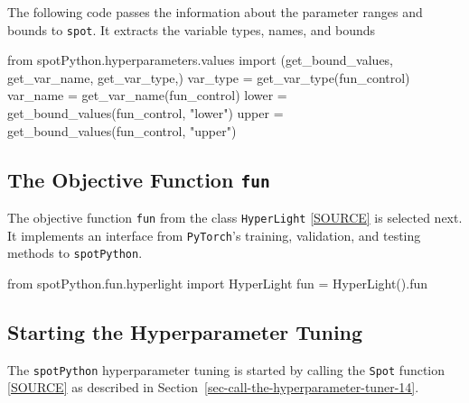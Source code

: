 \documentclass[
  letterpaper,
  DIV=11,
  numbers=noendperiod]{scrreprt}
\newenvironment{Shaded}{\begin{snugshade}}{\end{snugshade}}
\newcommand{\ImportTok}[1]{\textcolor[rgb]{0.00,0.46,0.62}{#1}}
\newcommand{\NormalTok}[1]{\textcolor[rgb]{0.00,0.23,0.31}{#1}}
\newcommand{\OperatorTok}[1]{\textcolor[rgb]{0.37,0.37,0.37}{#1}}
\newcommand{\StringTok}[1]{\textcolor[rgb]{0.13,0.47,0.30}{#1}}
\begin{document}
The following code passes the information about the parameter ranges and
bounds to \texttt{spot}. It extracts the variable types, names, and
bounds

\begin{Shaded}
\begin{Highlighting}[]
\ImportTok{from}\NormalTok{ spotPython.hyperparameters.values }\ImportTok{import}\NormalTok{ (get\_bound\_values,}
\NormalTok{    get\_var\_name,}
\NormalTok{    get\_var\_type,)}
\NormalTok{var\_type }\OperatorTok{=}\NormalTok{ get\_var\_type(fun\_control)}
\NormalTok{var\_name }\OperatorTok{=}\NormalTok{ get\_var\_name(fun\_control)}
\NormalTok{lower }\OperatorTok{=}\NormalTok{ get\_bound\_values(fun\_control, }\StringTok{"lower"}\NormalTok{)}
\NormalTok{upper }\OperatorTok{=}\NormalTok{ get\_bound\_values(fun\_control, }\StringTok{"upper"}\NormalTok{)}
\end{Highlighting}
\end{Shaded}

\hypertarget{sec-the-objective-function-31}{%
\subsection{\texorpdfstring{The Objective Function
\texttt{fun}}{The Objective Function fun}}\label{sec-the-objective-function-31}}

The objective function \texttt{fun} from the class \texttt{HyperLight}
\href{https://github.com/sequential-parameter-optimization/spotPython/blob/main/src/spotPython/light/hyperlight.py}{{[}SOURCE{]}}
is selected next. It implements an interface from \texttt{PyTorch}'s
training, validation, and testing methods to \texttt{spotPython}.

\begin{Shaded}
\begin{Highlighting}[]
\ImportTok{from}\NormalTok{ spotPython.fun.hyperlight }\ImportTok{import}\NormalTok{ HyperLight}
\NormalTok{fun }\OperatorTok{=}\NormalTok{ HyperLight().fun}
\end{Highlighting}
\end{Shaded}

\hypertarget{sec-call-the-hyperparameter-tuner-31}{%
\subsection{Starting the Hyperparameter
Tuning}\label{sec-call-the-hyperparameter-tuner-31}}

The \texttt{spotPython} hyperparameter tuning is started by calling the
\texttt{Spot} function
\href{https://github.com/sequential-parameter-optimization/spotPython/blob/main/src/spotPython/spot/spot.py}{{[}SOURCE{]}}
as described in Section~\ref{sec-call-the-hyperparameter-tuner-14}.
\end{document}
